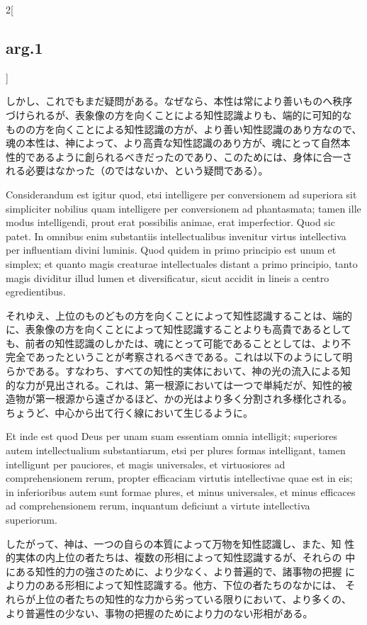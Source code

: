 \documentclass[paper=a4paper,fontsize=10pt,jafontsize=9pt,titlepage]{jlreq}
\begin{document}
\begin{paracol}{2}[\subsection{arg.1}]
\switchcolumn

しかし、これでもまだ疑問がある。なぜなら、本性は常により善いものへ秩序
づけられるが、表象像の方を向くことによる知性認識よりも、端的に可知的な
ものの方を向くことによる知性認識の方が、より善い知性認識のあり方なので、
魂の本性は、神によって、より高貴な知性認識のあり方が、魂にとって自然本
性的であるように創られるべきだったのであり、このためには、身体に合一さ
れる必要はなかった（のではないか、という疑問である）。

\switchcolumn*

Considerandum est igitur quod, etsi intelligere per conversionem ad
superiora sit simpliciter nobilius quam intelligere per conversionem
ad phantasmata; tamen ille modus intelligendi, prout erat possibilis
animae, erat imperfectior. Quod sic patet. In omnibus enim substantiis
intellectualibus invenitur virtus intellectiva per influentiam divini
luminis. Quod quidem in primo principio est unum et simplex; et quanto
magis creaturae intellectuales distant a primo principio, tanto magis
dividitur illud lumen et diversificatur, sicut accidit in lineis a
centro egredientibus.

\switchcolumn

それゆえ、上位のものどもの方を向くことによって知性認識することは、端的
に、表象像の方を向くことによって知性認識することよりも高貴であるとして
も、前者の知性認識のしかたは、魂にとって可能であることとしては、より不
完全であったということが考察されるべきである。これは以下のようにして明
らかである。すなわち、すべての知性的実体において、神の光の流入による知
的な力が見出される。これは、第一根源においては一つで単純だが、知性的被
造物が第一根源から遠ざかるほど、かの光はより多く分割され多様化される。
ちょうど、中心から出て行く線において生じるように。

\switchcolumn*

Et inde est quod Deus per unam suam essentiam omnia intelligit;
superiores autem intellectualium substantiarum, etsi per plures formas
intelligant, tamen intelligunt per pauciores, et magis universales, et
virtuosiores ad comprehensionem rerum, propter efficaciam virtutis
intellectivae quae est in eis; in inferioribus autem sunt formae
plures, et minus universales, et minus efficaces ad comprehensionem
rerum, inquantum deficiunt a virtute intellectiva superiorum.

\switchcolumn

したがって、神は、一つの自らの本質によって万物を知性認識し、また、知
性的実体の内上位の者たちは、複数の形相によって知性認識するが、それらの
中にある知性的力の強さのために、より少なく、より普遍的で、諸事物の把握
により力のある形相によって知性認識する。他方、下位の者たちのなかには、
それらが上位の者たちの知性的な力から劣っている限りにおいて、より多くの、
より普遍性の少ない、事物の把握のためにより力のない形相がある。


\end{paracol}
\end{document}
